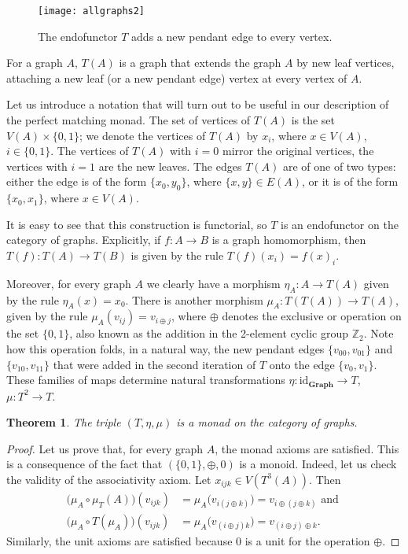\documentclass[reqno,A4paper]{amsart}
\newcommand{\id}{\mathrm{id}}
\newcommand{\Graph}{\mathbf{Graph}}
\newtheorem{theorem}{Theorem}[section]
\theoremstyle{definition}
\numberwithin{equation}{section}
\begin{document}
\begin{figure}
\begin{center}
\texttt{[image: allgraphs2]}
\end{center}
\caption{The endofunctor $T$ adds a new pendant edge to every vertex.}
\label{fig:Tmonad}
\end{figure}

For a graph $A$, $T(A)$ is a graph that extends the graph $A$ by new leaf
vertices, attaching a new leaf (or a new pendant edge) vertex at every vertex
of $A$.

Let us introduce a notation that will turn out to be useful in our description
of the perfect matching monad. The set of vertices of $T(A)$ is the set
$V(A)\times\{0,1\}$; we denote the vertices of $T(A)$ by $x_i$, where $x\in
V(A)$, $i\in\{0,1\}$.  The vertices of $T(A)$ with $i=0$ mirror the original
vertices, the vertices with $i=1$ are the new leaves. The edges $T(A)$ are of
one of two types: either the edge is of the form $\{x_0,y_0\}$, where
$\{x,y\}\in E(A)$, or it is of the form $\{x_0,x_1\}$, where $x\in V(A)$.

It is easy to see that this construction is functorial, so $T$ is an
endofunctor on the category of graphs. Explicitly, if $f:A\to B$ is a graph
homomorphism, then $T(f):T(A)\to T(B)$ is given by the rule
$T(f)(x_i)=f(x)_i$.

Moreover, for every graph $A$ we clearly have a morphism $\eta_A:A\to T(A)$
given by the rule $\eta_A(x)=x_0$. There is another morphism $\mu_A:T(T(A))\to
T(A)$, given by the rule $\mu_A(v_{ij})=v_{i\oplus j}$, where $\oplus$ denotes
the exclusive or operation on the set $\{0,1\}$, also
known as the addition in the 2-element cyclic group $\mathbb Z_2$.
Note how this operation folds, in a natural way,
the new pendant edges $\{v_{00},v_{01}\}$ and $\{v_{10},v_{11}\}$ that were
added in the second iteration of $T$ onto the edge $\{v_0,v_1\}$.
These families of maps determine natural transformations
$\eta:\id_\Graph\to T$, $\mu:T^2\to T$.

\begin{theorem}
The triple $(T,\eta,\mu)$ is a monad on the category of graphs.
\end{theorem}
\begin{proof}
Let us prove that, for every graph $A$, the monad axioms
are satisfied. This is a consequence of the fact that
$(\{0,1\},\oplus,0)$ is a monoid. Indeed, let us check the validity of the 
associativity axiom. Let $x_{ijk}\in V(T^3(A))$. Then 
\begin{align*}
\bigl(\mu_A\circ\mu_T(A)\bigr)(v_{ijk})&=\mu_A\bigl(v_{i(j\oplus k)}\bigr)=v_{i\oplus(j\oplus k)}\text{ and }\\
\bigl(\mu_A\circ T(\mu_A)\bigr)(v_{ijk})&=\mu_A\bigl(v_{(i\oplus j)k}\bigr)=v_{(i\oplus j)\oplus k}.
\end{align*}
Similarly, the unit axioms are satisfied because $0$ is a unit for the operation $\oplus$.
\end{proof}
\end{document}
